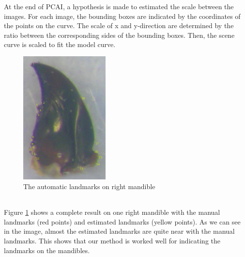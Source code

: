 \documentclass[twoside,twocolumn,10pt]{article}
\begin{document}
At the end of PCAI, a hypothesis is made to estimated the scale between the images. For each image, the bounding boxes are indicated by the coordinates of the points on the curve. The scale of x and y-direction are determined by the ratio between the corresponding sides of the bounding boxes. Then, the scene curve is scaled to fit the model curve. 
\begin{figure}[h]
\centering
\includegraphics[width=0.4\textwidth]{./images/md_rs}
\caption{The automatic landmarks on right mandible}
\label{figresult}
\end{figure}~\\
Figure \ref{figresult} shows a complete result on one right mandible with the manual landmarks (red points) and estimated landmarks (yellow points). As we can see in the image, almost the estimated landmarks are quite near with the manual landmarks. This shows that our method is worked well for indicating the landmarks on the mandibles.\\
\end{document}
